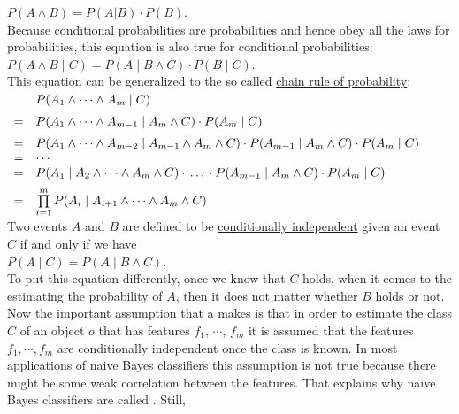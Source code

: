 $P(A \wedge B) = P(A|B) \cdot P(B)$.
\\[0.2cm]
Because conditional probabilities are probabilities and hence obey all the laws for probabilities, this
equation is also true for conditional probabilities: 
\\[0.2cm]
\hspace*{1.3cm}
$P(A \wedge B\;|\;C) = P(A\;|\;B \wedge C) \cdot P(B\;|\;C)$.
\\[0.2cm]
This equation can be generalized to the so called \href{https://en.wikipedia.org/wiki/Chain_rule_(probability)}{chain rule of probability}:
\\[0.2cm]
\hspace*{1.2cm}
$
\begin{array}[t]{cl}
    &   P(A_1 \wedge \cdots \wedge A_m \;|\;C) \\[0.2cm]
  = & P(A_1 \wedge  \cdots \wedge A_{m-1}\;|\;A_{m} \wedge C) \cdot P(A_{m}\;|\;C) \\[0.2cm]
  = & P(A_1 \wedge  \cdots \wedge A_{m-2}\;|\;A_{m-1} \wedge A_{m} \wedge C) \cdot P(A_{m-1} \;|\;A_m \wedge C)\cdot P(A_{m}\;|\;C) \\
  = & \cdots \\
  = &  P(A_1 \;|\; A_2 \wedge  \cdots \wedge A_{m} \wedge C) \cdot \,\dots\, \cdot P(A_{m-1} \;|\;A_m \wedge C)\cdot P(A_{m}\;|\;C) \\[0.2cm]
  = & \prod\limits_{i=1}^m P(A_i \;|\; A_{i+1} \wedge  \cdots \wedge A_{m} \wedge C) 
\end{array}
$
\\[0.2cm]
Two events $A$ and $B$ are defined to be \href{https://en.wikipedia.org/wiki/Conditional_independence}{conditionally independent}
given an event $C$ if and only if we have
\\[0.2cm]
\hspace*{1.3cm}
$P(A \;|\; C) = P(A \;|\; B \wedge C)$.
\\[0.2cm]
To put this equation differently, once we know that $C$ holds, when it comes to the estimating the probability of $A$,
then it does not matter whether $B$ holds or not.  Now the important assumption that a  
makes is that in order to estimate the class $C$ of an object $o$ that has features $f_1$, $\cdots$, $f_m$ it
is assumed that the features $f_1, \cdots, f_m$ are conditionally independent once the class is known.  In
most applications of naive Bayes classifiers this assumption is not true because there might be some weak
correlation between the features.  That explains why naive Bayes classifiers are called .  Still,
